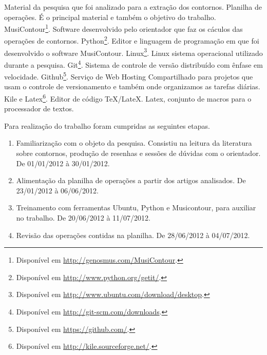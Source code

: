 \documentclass[11pt]{article}
\begin{document}
Material da pesquisa que foi analizado para a extração dos contornos.
Planilha de operações. É o principal material e também o
objetivo do trabalho.
MusiContour\footnote{Disponível em
  \url{http://genosmus.com/MusiContour}.}. Software desenvolvido pelo
orientador que faz os cáculos das operações de contornos.
Python\footnote{Disponível em
  \url{http://www.python.org/getit/}.}. Editor e linguagem de
programação em que foi desenvolvido o software MusiContour.
Linux\footnote{Disponível em
  \url{http://www.ubuntu.com/download/desktop}.}. Linux sistema
operacional utilizado durante a pesquisa.  Git\footnote{Disponível em
  \url{http://git-scm.com/downloads}.}. Sistema de controle de versão
distribuído com ênfase em velocidade.  Github\footnote{Disponível em
  \url{https://github.com/}.}. Serviço de Web Hosting Compartilhado
para projetos que usam o controle de versionamento e também onde
organizamos as tarefas diárias.  Kile e Latex\footnote{Disponível em
  \url{http://kile.sourceforge.net/}.}. Editor de código
TeX/LateX. Latex, conjunto de macros para o processador de textos.


Para realização do trabalho foram cumpridas as seguintes etapas.

\begin{enumerate}
\item Familiarização com o objeto da pesquisa. Consistiu na leitura da 
  literatura sobre contornos, produção de resenhas e sessões de dúvidas 
  com o orientador. De 01/01/2012 à 30/01/2012.
\item Alimentação da planilha de operações a partir dos artigos 
  analisados. De 23/01/2012 à 06/06/2012.
\item Treinamento com ferramentas Ubuntu, Python e Musicontour, para
  auxiliar no trabalho. De 20/06/2012 à 11/07/2012.
\item Revisão das operações contidas na planilha. De 28/06/2012 à 04/07/2012.
\end{enumerate}
\end{document}
